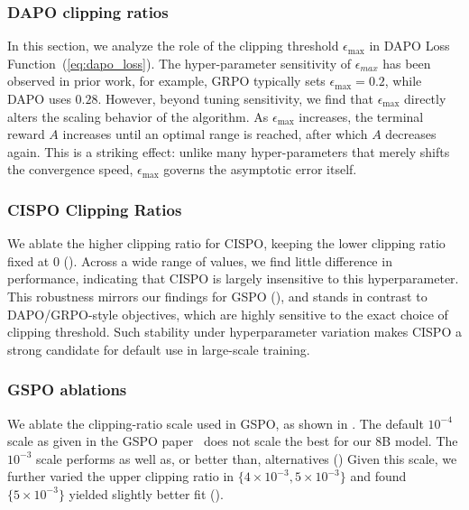 \documentclass[]{fairmeta} %
\begin{document}
\subsubsection{DAPO clipping ratios} \label{appendix:grpo_eps}
In this section, we analyze the role of the clipping threshold $\epsilon_{\max}$ in DAPO Loss Function~(\cref{eq:dapo_loss}). The hyper-parameter sensitivity of $\epsilon_{max}$ has been observed in prior work, for example, GRPO typically sets $\epsilon_{\max}=0.2$, while DAPO uses $0.28$. However, beyond tuning sensitivity, we find that $\epsilon_{\max}$ directly alters the scaling behavior of the algorithm. 
As $\epsilon_{\max}$ increases, the terminal reward $A$ increases until an optimal range is reached, after which $A$ decreases again. 
This is a striking effect: unlike many hyper-parameters that merely shifts the convergence speed, $\epsilon_{\max}$ governs the asymptotic error itself.



\subsubsection{CISPO Clipping Ratios}\label{appendix:dense_impala}
We ablate the higher clipping ratio for CISPO, keeping the lower clipping ratio fixed at $0$ (). 
Across a wide range of values, we find little difference in performance, indicating that CISPO is largely insensitive to this hyperparameter. 
This robustness mirrors our findings for GSPO (), and stands in contrast to DAPO/GRPO-style objectives, which are highly sensitive to the exact choice of clipping threshold. 
Such stability under hyperparameter variation makes CISPO a strong candidate for default use in large-scale training.


\subsubsection{GSPO ablations} \label{appendix:gspo_scale}
We ablate the clipping-ratio scale used in GSPO, as shown in . The default $10^{-4}$ scale as given in the GSPO paper~\cite{gspo} does not scale the best for our 8B model.
The $10^{-3}$ scale performs as well as, or better than, alternatives ()
Given this scale, we further varied the upper clipping ratio in $\{4\!\times\!10^{-3}, 5\!\times\!10^{-3}\}$ and found $\{5\!\times\!10^{-3}\}$ yielded slightly better fit ().
\end{document}
